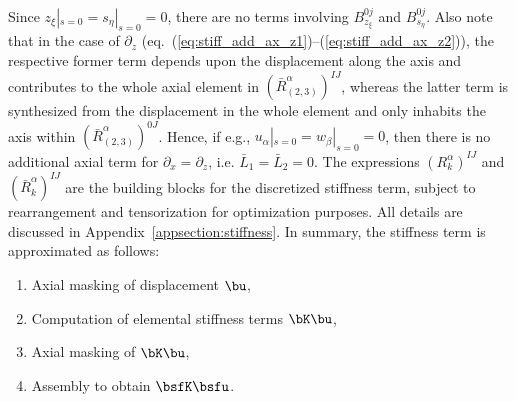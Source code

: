 \label{eq:stiff_add_ax_z1}\\
\label{eq:stiff_add_ax_z2}
\ena
%
Since $z_\xi|_{s=0}=s_\eta|_{s=0}=0$, there are no terms involving
$B^{0j}_{z_\xi}$ and $B^{0j}_{s_\eta}$.
Also note that in the case of $\partial_z$
(eq.~(\ref{eq:stiff_add_ax_z1})--(\ref{eq:stiff_add_ax_z2})), the respective
former term depends upon the displacement along the axis and contributes to
the whole axial element in $(\bar{R}^\alpha_{(2,3)})^{IJ}$, whereas the latter
term is synthesized from the displacement in the whole element and only
inhabits the axis within $(\bar{R}^\alpha_{(2,3)})^{0J}$. Hence, if e.g.,
$u_\alpha|_{s=0}=w_\beta|_{s=0}=0$, then there is no additional axial term
for $\partial_x=\partial_z$, i.e. $\bar{L}_1=\bar{L}_2=0$.
%
The expressions $(R_k^\alpha)^{IJ}$ and
$(\bar{R}_k^\alpha)^{IJ}$ are the building blocks for the discretized
stiffness term, subject to rearrangement and tensorization
for optimization purposes. All details are discussed in
Appendix~\ref{appsection:stiffness}. In summary, the stiffness term is
approximated as follows:
%
\begin{enumerate}
\item Axial masking of displacement $\bu$,
\item Computation of elemental stiffness terms $\bK\bu$,
\item Axial masking of $\bK\bu$,
\item Assembly to obtain $\bsfK\bsfu$.
\end{enumerate}
%

